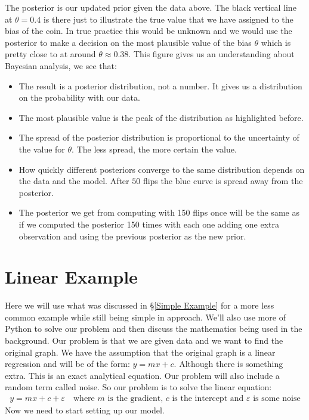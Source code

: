 \documentclass[11pt]{article}   %
\begin{document}
The posterior is our updated prior given the data above. The black vertical line at $\theta = 0.4$ is there just to illustrate the true value that we have assigned to the bias of the coin. In true practice this would be unknown and we would use the posterior to make a decision on the most plausible value of the bias $\theta$ which is pretty close to at around $\theta \approx 0.38$. This figure gives us an understanding about Bayesian analysis, we see that:
\begin{itemize}
\item The result is a posterior distribution, not a number. It gives us a distribution on the probability with our data.
\item The most plausible value is the peak of the distribution as highlighted before.
\item The spread of the posterior distribution is proportional to the uncertainty of the value for $\theta$. The less spread, the more certain the value.
\item How quickly different posteriors converge to the same distribution depends on the data and the model. After $50$ flips the blue curve is spread away from the posterior.
\item The posterior we get from computing with 150 flips once will be the same as if we computed the posterior 150 times with each one adding one extra observation and using the previous posterior as the new prior.
\end{itemize}

\section{Linear Example}\label{Linear Example}

Here we will use what was discussed in \S\ref{Simple Example} for a more less common example while still being simple in approach. We'll also use more of Python to solve our problem and then discuss the mathematics being used in the background. Our problem is that we are given data and we want to find the original graph. We have the assumption that the original graph is a linear regression and will be of the form: $y = mx + c$. Although there is something extra. This is an exact analytical equation. Our problem will also include a random term called noise. So our problem is to solve the linear equation:
\begin{align*}
y = mx + c + \varepsilon\quad\text{where $m$ is the gradient, $c$ is the intercept and $\varepsilon$ is some noise}
\end{align*}
Now we need to start setting up our model.
\end{document}
